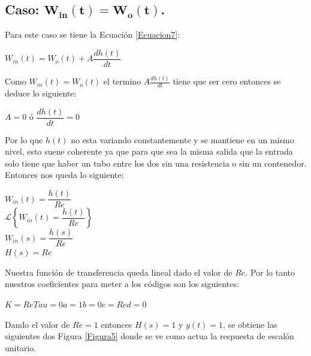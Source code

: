 \documentclass[12pt,a4paper]{article}
\begin{document}
\subsection{Caso: $\mathbf{W_{in}(t) = W_{o}(t)}$.}
Para este caso se tiene la Ecuación \ref{Ecuacion7}:
\begin{center}
$W_{in}(t) = W_{o}(t) + A\dfrac{dh(t)}{dt}$
\end{center}
Como $W_{in}(t) = W_{o}(t)$ el termino $A\frac{dh(t)}{dt}$ tiene que ser cero entonces se deduce lo siguiente:
\begin{center}
$A = 0$ \hspace{2cm} ó \hspace{2cm} $\dfrac{dh(t)}{dt} = 0$
\end{center}
Por lo que $h(t)$ no esta variando constantemente y se mantiene en un mismo nivel, esto suene coherente ya que para que sea la misma salida que la entrada solo tiene que haber un tubo entre los dos sin una resistencia o sin un contenedor. Entonces nos queda lo siguiente:
\begin{center}
$W_{in}(t) = \dfrac{h(t)}{Re}$\\[12pt]
$\mathcal{L}\left\lbrace W_{in}(t) = \dfrac{h(t)}{Re}\right\rbrace$\\[12pt]
$W_{in}(s) = \dfrac{h(s)}{Re}$\\[12pt]
$H(s) = Re$
\end{center}
Nuestra función de transferencia queda lineal dado el valor de $Re$. Por lo tanto nuestros coeficientes para meter a los códigos son los siguientes:
\begin{center}
$K = Re$\hspace{3cm}$Tau = 0$\hspace{3cm}$a= 1$\hspace{3cm}$b = 0$\hspace{3cm}$c = Re$\hspace{3cm}$d = 0$
\end{center} 
Dando el valor de $Re = 1$ entonces $H(s) = 1$ y $y(t) = 1$, se obtiene las siguientes dos Figura \ref{Figura5} donde se ve como actua la respuesta de escalón unitario.\\[12pt]
\end{document}
